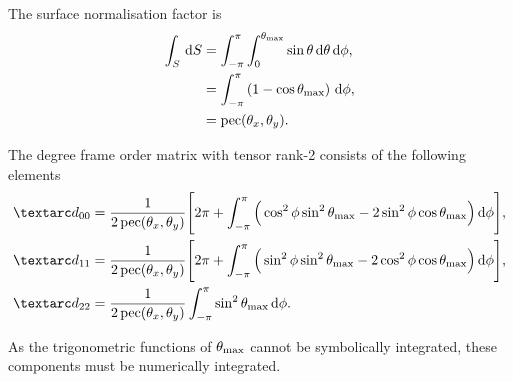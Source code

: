 The surface normalisation factor is
\begin{subequations}
\begin{align}
    \int_S \,\mathrm{d} S &= \int_{-\pi}^{\pi} \int_{0}^{\theta_\textrm{max}} \sin\theta \,\mathrm{d}\theta \,\mathrm{d}\phi , \\
                   &= \int_{-\pi}^{\pi} \left( 1 - \cos\theta_\textrm{max} \right) \,\mathrm{d}\phi , \\
                   &= \operatorname{pec}(\theta_x, \theta_y) .
\end{align}
\end{subequations}



The  degree frame order matrix with tensor rank-2 consists of the following elements
\begin{subequations} \label{eq: pseudo-ellipse, torsionless 1st degree frame order matrix}
\begin{align}
    \FO_{00} &= \frac{1}{2\pec(\conethetax, \conethetay)} \Bigg[
                    2\pi +
                    \int_{-\pi}^{\pi}
                        \Big( \cos^2\phi \sin^2\conethetamax - 2\sin^2\phi \cos\conethetamax \Big)
                    \diff\phi
                \Bigg] , \\
    \FO_{11} &= \frac{1}{2\pec(\conethetax, \conethetay)} \Bigg[
                    2\pi +
                    \int_{-\pi}^{\pi}
                        \Big( \sin^2\phi \sin^2\conethetamax - 2\cos^2\phi \cos\conethetamax \Big)
                    \diff\phi
                \Bigg] , \\
    \FO_{22} &= \frac{1}{2\pec(\conethetax, \conethetay)}
                    \int_{-\pi}^{\pi}
                        \sin^2\conethetamax
                    \diff\phi .
\end{align}
\end{subequations}

As the trigonometric functions of $\theta_\textrm{max}$ cannot be symbolically integrated, these components must be numerically integrated.



